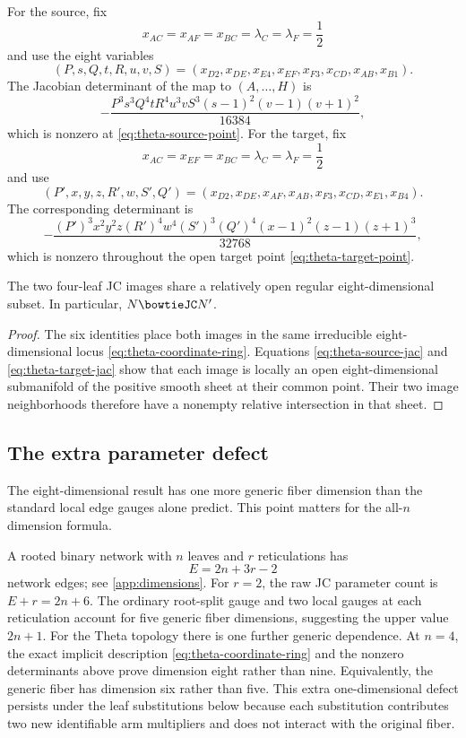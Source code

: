 For the source, fix
\[
x_{AC}=x_{AF}=x_{BC}=\lambda_C=\lambda_F=\frac12
\]
and use the eight variables
\[
(P,s,Q,t,R,u,v,S)
=(x_{D2},x_{DE},x_{E4},x_{EF},x_{F3},x_{CD},x_{AB},x_{B1}).
\]
The Jacobian determinant of the map to $(A,\ldots,H)$ is
\begin{equation}\label{eq:theta-source-jac}
-\frac{P^3s^3Q^4tR^4u^3vS^3(s-1)^2(v-1)(v+1)^2}{16384},
\end{equation}
which is nonzero at \eqref{eq:theta-source-point}.  For the target, fix
\[
x_{AC}=x_{EF}=x_{BC}=\lambda_C=\lambda_F=\frac12
\]
and use
\[
(P',x,y,z,R',w,S',Q')
=(x_{D2},x_{DE},x_{AF},x_{AB},x_{F3},x_{CD},x_{E1},x_{B4}).
\]
The corresponding determinant is
\begin{equation}\label{eq:theta-target-jac}
-\frac{(P')^3x^2y^2z(R')^4w^4(S')^3(Q')^4
(x-1)^2(z-1)(z+1)^3}{32768},
\end{equation}
which is nonzero throughout the open target point \eqref{eq:theta-target-point}.

\begin{corollary}\label{cor:theta-four-leaf}
The two four-leaf JC images share a relatively open regular eight-dimensional subset.  In particular, $N\bowtieJC N'$.
\end{corollary}

\begin{proof}
The six identities place both images in the same irreducible eight-dimensional locus \eqref{eq:theta-coordinate-ring}.  Equations \eqref{eq:theta-source-jac} and \eqref{eq:theta-target-jac} show that each image is locally an open eight-dimensional submanifold of the positive smooth sheet at their common point.  Their two image neighborhoods therefore have a nonempty relative intersection in that sheet.
\end{proof}

\subsection{The extra parameter defect}

The eight-dimensional result has one more generic fiber dimension than the standard local edge gauges alone predict.  This point matters for the all-$n$ dimension formula.

A rooted binary network with $n$ leaves and $r$ reticulations has
\begin{equation}\label{eq:sharp-edge-count}
E=2n+3r-2
\end{equation}
network edges; see \cref{app:dimensions}.  For $r=2$, the raw JC parameter count is
$E+r=2n+6$.  The ordinary root-split gauge and two local gauges at each reticulation account for five generic fiber dimensions, suggesting the upper value $2n+1$.  For the Theta topology there is one further generic dependence.  At $n=4$, the exact implicit description \eqref{eq:theta-coordinate-ring} and the nonzero determinants above prove dimension eight rather than nine.  Equivalently, the generic fiber has dimension six rather than five.  This extra one-dimensional defect persists under the leaf substitutions below because each substitution contributes two new identifiable arm multipliers and does not interact with the original fiber.

